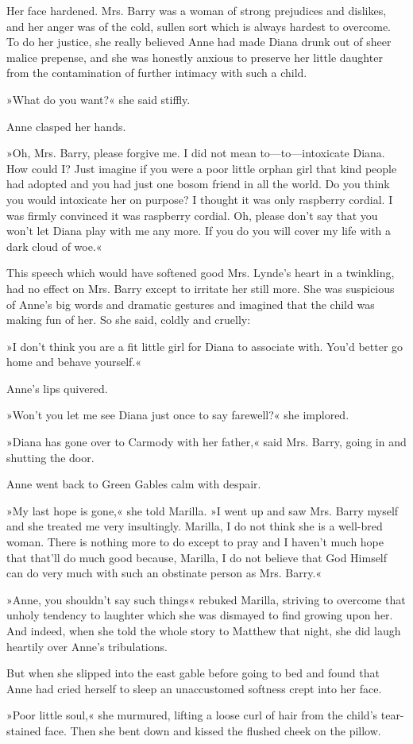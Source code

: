 Her face hardened. Mrs. Barry was a woman of strong prejudices and dislikes, and her anger was of the cold, sullen sort which is always hardest to overcome. To do her justice, she really believed Anne had made Diana drunk out of sheer malice prepense, and she was honestly anxious to preserve her little daughter from the contamination of further intimacy with such a child.

»What do you want?« she said stiffly.

Anne clasped her hands.

»Oh, Mrs. Barry, please forgive me. I did not mean to—to—intoxicate Diana. How could I? Just imagine if you were a poor little orphan girl that kind people had adopted and you had just one bosom friend in all the world. Do you think you would intoxicate her on purpose? I thought it was only raspberry cordial. I was firmly convinced it was raspberry cordial. Oh, please don't say that you won't let Diana play with me any more. If you do you will cover my life with a dark cloud of woe.«

This speech which would have softened good Mrs. Lynde's heart in a twinkling, had no effect on Mrs. Barry except to irritate her still more. She was suspicious of Anne's big words and dramatic gestures and imagined that the child was making fun of her. So she said, coldly and cruelly:

»I don't think you are a fit little girl for Diana to associate with. You'd better go home and behave yourself.«

Anne's lips quivered.

»Won't you let me see Diana just once to say farewell?« she implored.

»Diana has gone over to Carmody with her father,« said Mrs. Barry, going in and shutting the door.

Anne went back to Green Gables calm with despair.

»My last hope is gone,« she told Marilla. »I went up and saw Mrs. Barry myself and she treated me very insultingly. Marilla, I do not think she is a well-bred woman. There is nothing more to do except to pray and I haven't much hope that that'll do much good because, Marilla, I do not believe that God Himself can do very much with such an obstinate person as Mrs. Barry.«

»Anne, you shouldn't say such things« rebuked Marilla, striving to overcome that unholy tendency to laughter which she was dismayed to find growing upon her. And indeed, when she told the whole story to Matthew that night, she did laugh heartily over Anne's tribulations.

But when she slipped into the east gable before going to bed and found that Anne had cried herself to sleep an unaccustomed softness crept into her face.

»Poor little soul,« she murmured, lifting a loose curl of hair from the child's tear-stained face. Then she bent down and kissed the flushed cheek on the pillow.